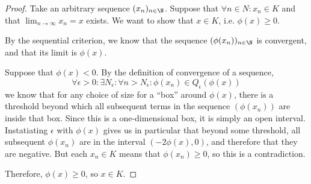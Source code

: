 \documentclass[letterpaper,11pt]{article}
\begin{document}
\begin{proof}
  Take an arbitrary sequence $(x_n)_{n\in\N}$. Suppose that
  $\forall n \in N : x_n \in K$ and that $\lim_{n\to\infty} x_n = x$ exists.
  We want to show that $x \in K$, i.e. $\phi(x) \geq 0$.

  By the sequential criterion, we know that the sequence $(\phi(x_n))_{n\in\N}$
  is convergent, and that its limit is $\phi(x)$.

  Suppose that $\phi(x) < 0$. By the definition of convergence of a sequence,
  \begin{equation*}
    \forall \epsilon > 0 : \exists N_\epsilon : \forall n > N_\epsilon :
    \phi(x_n) \in Q_\epsilon(\phi(x))
  \end{equation*}
  we know that for any choice of size for a ``box'' around $\phi(x)$, there is
  a threshold beyond which all subsequent terms in the sequence $(\phi(x_n))$
  are inside that box. Since this is a one-dimensional box, it is simply an
  open interval. Instatiating $\epsilon$ with $\phi(x)$ gives us in particular
  that beyond some threshold, all subsequent $\phi(x_n)$ are in the interval
  $(-2\phi(x), 0)$, and therefore that they are negative. But each $x_n \in K$
  means that $\phi(x_n) \geq 0$, so this is a contradiction.

  Therefore, $\phi(x) \geq 0$, so $x \in K$.
\end{proof}
\end{document}
